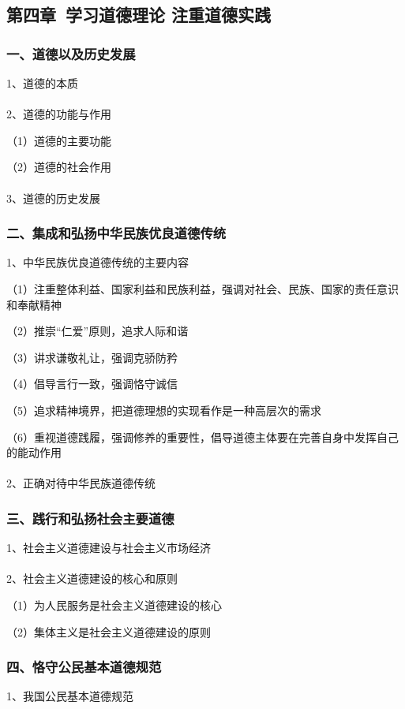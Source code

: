 \documentclass{ctexart}
\begin{document}
\subsection{第四章\ 学习道德理论 注重道德实践}

\subsubsection{一、道德以及历史发展}
1、道德的本质
\\\\

2、道德的功能与作用

（1）道德的主要功能

（2）道德的社会作用
\\\\

3、道德的历史发展

\subsubsection{二、集成和弘扬中华民族优良道德传统}
1、中华民族优良道德传统的主要内容

（1）注重整体利益、国家利益和民族利益，强调对社会、民族、国家的责任意识和奉献精神

（2）推崇“仁爱”原则，追求人际和谐

（3）讲求谦敬礼让，强调克骄防矜

（4）倡导言行一致，强调恪守诚信

（5）追求精神境界，把道德理想的实现看作是一种高层次的需求

（6）重视道德践履，强调修养的重要性，倡导道德主体要在完善自身中发挥自己的能动作用
\\\\

2、正确对待中华民族道德传统

\subsubsection{三、践行和弘扬社会主要道德}
1、社会主义道德建设与社会主义市场经济
\\\\

2、社会主义道德建设的核心和原则

（1）为人民服务是社会主义道德建设的核心

（2）集体主义是社会主义道德建设的原则

\subsubsection{四、恪守公民基本道德规范}
1、我国公民基本道德规范
\end{document}
